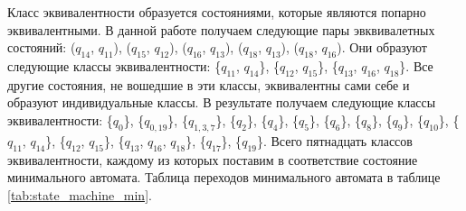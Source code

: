 \documentclass[a4paper,14pt,russian]{extarticle} %
\begin{document}
Класс эквивалентности образуется состояниями, которые являются попарно эквивалентными. В данной работе получаем следующие пары эвквивалетных состояний:
(\({q_{14}}\), \({q_{11}}\)), 
(\({q_{15}}\), \({q_{12}}\)), 
(\({q_{16}}\), \({q_{13}}\)), 
(\({q_{18}}\), \({q_{13}}\)), 
(\({q_{18}}\), \({q_{16}}\)). 
Они образуют следующие классы эквивалентности:
\{\({q_{11}}\), \({q_{14}}\)\},
\{\({q_{12}}\), \({q_{15}}\)\},
\{\({q_{13}}\), \({q_{16}}\), \({q_{18}}\)\}.
Все другие состояния, не вошедшие в эти классы, эквивалентны сами себе и образуют индивидуальные классы. В результате получаем следующие классы эквивалентности:
\{\({q_{0}}\)\},
\{\({q_{0,19}}\)\},
\{\({q_{1,3,7}}\)\},
\{\({q_{2}}\)\},
\{\({q_{4}}\)\},
\{\({q_{5}}\)\},
\{\({q_{6}}\)\},
\{\({q_{8}}\)\},
\{\({q_{9}}\)\},
\{\({q_{10}}\)\},
\{\({q_{11}}\), \({q_{14}}\)\},
\{\({q_{12}}\), \({q_{15}}\)\},
\{\({q_{13}}\), \({q_{16}}\), \({q_{18}}\)\},
\{\({q_{17}}\)\},
\{\({q_{19}}\)\}.
Всего пятнадцать классов эквивалентности, каждому из которых поставим в соответствие состояние минимального автомата. Таблица переходов минимального автомата в таблице \ref{tab:state_machine_min}. 
\end{document}
